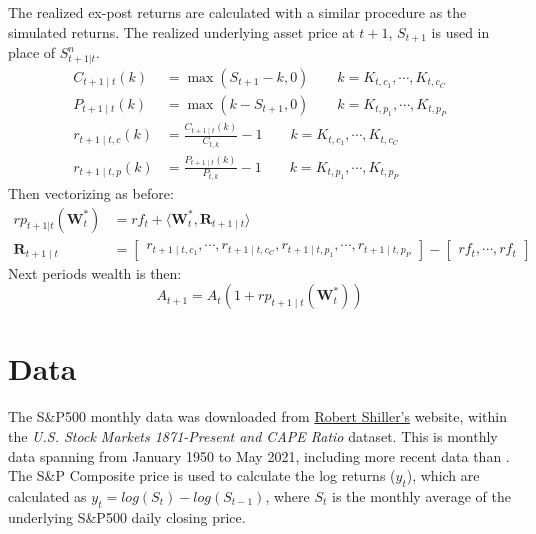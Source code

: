 The realized ex-post returns are calculated with a similar procedure as the simulated returns. The realized underlying asset price at $t+1$, $S_{t+1}$ is used in place of $S_{t+1|t}^{n}$.
\noindent
\begin{align} 
\nonumber C_{t+1 \mid t}(k) &= \max (S_{t+1} - k, 0) \quad \quad k = K_{t, c_{1}}, \cdots, K_{t, c_{C}} 
\\ \nonumber P_{t+1 \mid t}(k) &= \max (k - S_{t+1}, 0) \quad \quad k = K_{t, p_{1}}, \cdots, K_{t, p_{P}}
\\ \nonumber r_{t+1 \mid t, c}(k) &= \frac{C_{t+1 \mid t}(k)}{C_{t, k}} - 1 \quad \quad k = K_{t, c_{1}}, \cdots, K_{t, c_{C}}
\\ \nonumber r_{t+1 \mid t, p}(k) &= \frac{P_{t+1 \mid t}(k)}{P_{t, k}} - 1 \quad \quad k = K_{t, p_{1}}, \cdots, K_{t, p_{P}}
\end{align}
\noindent
Then vectorizing as before:
\noindent
\begin{align}
\nonumber rp_{t+1|t}(\mathbf{W}_{t}^{*}) &= rf_{t} + \langle\mathbf{W}_{t}^{*}, \mathbf{R}_{t+1 \mid t}\rangle
\\ \nonumber \mathbf{R}_{t+1 \mid t} &= \begin{bmatrix} r_{t + 1 \mid t, c_{1}}, \dotsb, r_{t + 1 \mid t, c_{C}}, r_{t + 1 \mid t, p_{1}}, \dotsb, r_{t + 1 \mid t, p_{P}} \end{bmatrix} - \begin{bmatrix} rf_{t}, \dotsb, rf_{t} \end{bmatrix}
\end{align}
\noindent
Next periods wealth is then:
\noindent
\[A_{t+1} = A_{t} (1 + rp_{t+1 \mid t}(\mathbf{W}_{t}^{*}))\]


\section{Data}\label{sec:Data}

The S\&P500 monthly data was downloaded from \href{http://www.econ.yale.edu/~shiller/data.htm}{Robert Shiller's} website, within the \textit{U.S. Stock Markets 1871-Present and CAPE Ratio} dataset. This is monthly data spanning from January 1950 to May 2021, including more recent data than \cite{faias2017optimal}. The S\&P Composite price is used to calculate the log returns ($y_{t}$), which are calculated as $y_{t} = log(S_{t}) - log(S_{t - 1})$, where $S_{t}$ is the monthly average of the underlying S\&P500 daily closing price.

